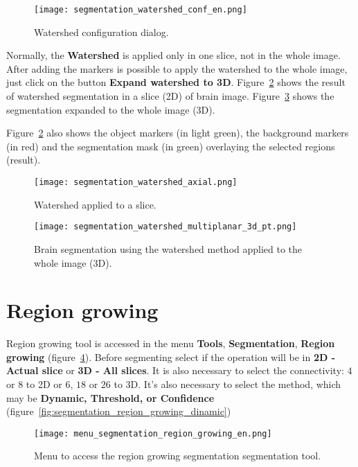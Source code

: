 \begin{figure}[!htb]
    \centering
    \texttt{[image: segmentation\_watershed\_conf\_en.png]}
    \caption{Watershed configuration dialog.}
    \label{fig:watershed_janela_conf}
\end{figure}

Normally, the \textbf{Watershed} is applied only in one slice, not in the whole image. After adding the markers is possible to apply the watershed to the whole image, just click on the button \textbf{Expand watershed to 3D}. Figure~\ref{fig:watershed_2d} shows the result of watershed segmentation in a slice (2D) of brain image. Figure~\ref{fig:watershed_3d} shows the segmentation expanded to the whole image (3D).

Figure~\ref{fig:watershed_2d} also shows the object markers (in light green), the background markers (in red) and the segmentation mask (in green) overlaying the selected regions (result).

\begin{figure}[!htb]
\centering
\texttt{[image: segmentation\_watershed\_axial.png]}
\caption{Watershed applied to a slice.}
\label{fig:watershed_2d}
\end{figure}

\begin{figure}[!htb]
\centering
\texttt{[image: segmentation\_watershed\_multiplanar\_3d\_pt.png]}
\caption{Brain segmentation using the watershed method applied to the whole image (3D).}
\label{fig:watershed_3d}
\end{figure}

\section{Region growing}

Region growing tool is accessed in the menu \textbf{Tools}, \textbf{Segmentation}, \textbf{Region growing} (figure~\ref{fig:menu_segmentation_region_growing}). Before segmenting select if the operation will be in \textbf{2D - Actual slice} or \textbf{3D - All slices}. It is also necessary to select the connectivity: $4$ or $8$ to 2D or $6$, $18$ or $26$ to 3D. It's also necessary to select the method, which may be \textbf{Dynamic, Threshold, or Confidence} (figure~\ref{fig:segmentation_region_growing_dinamic})

\begin{figure}[!htb]
    \centering
    \texttt{[image: menu\_segmentation\_region\_growing\_en.png]}
    \caption{Menu to access the region growing segmentation segmentation tool.}
    \label{fig:menu_segmentation_region_growing}
\end{figure}

